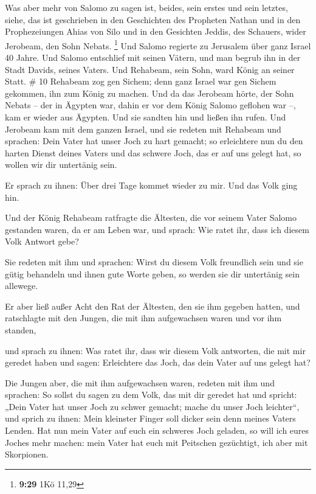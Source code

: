  Was aber mehr von Salomo zu sagen ist, beides, sein
erstes und sein letztes, siehe, das ist geschrieben in den Geschichten
des Propheten Nathan und in den Prophezeiungen Ahias von Silo und in den
Gesichten Jeddis, des Schauers, wider Jerobeam, den Sohn Nebats.
\footnote{\textbf{9:29} 1Kö 11,29}  Und Salomo regierte
zu Jerusalem über ganz Israel 40 Jahre.  Und Salomo
entschlief mit seinen Vätern, und man begrub ihn in der Stadt Davids,
seines Vaters. Und Rehabeam, sein Sohn, ward König an seiner Statt. \#
10  Rehabeam zog gen Sichem; denn ganz Israel war gen
Sichem gekommen, ihn zum König zu machen.  Und da das
Jerobeam hörte, der Sohn Nebats -- der in Ägypten war, dahin er vor dem
König Salomo geflohen war --, kam er wieder aus Ägypten. 
Und sie sandten hin und ließen ihn rufen. Und Jerobeam kam mit dem
ganzen Israel, und sie redeten mit Rehabeam und sprachen: 
Dein Vater hat unser Joch zu hart gemacht; so erleichtere nun du den
harten Dienst deines Vaters und das schwere Joch, das er auf uns gelegt
hat, so wollen wir dir untertänig sein.

 Er sprach zu ihnen: Über drei Tage kommet wieder zu mir.
Und das Volk ging hin.

 Und der König Rehabeam ratfragte die Ältesten, die vor
seinem Vater Salomo gestanden waren, da er am Leben war, und sprach: Wie
ratet ihr, dass ich diesem Volk Antwort gebe?

 Sie redeten mit ihm und sprachen: Wirst du diesem Volk
freundlich sein und sie gütig behandeln und ihnen gute Worte geben, so
werden sie dir untertänig sein allewege.

 Er aber ließ außer Acht den Rat der Ältesten, den sie ihm
gegeben hatten, und ratschlagte mit den Jungen, die mit ihm aufgewachsen
waren und vor ihm standen,

 und sprach zu ihnen: Was ratet ihr, dass wir diesem Volk
antworten, die mit mir geredet haben und sagen: Erleichtere das Joch,
das dein Vater auf uns gelegt hat?

 Die Jungen aber, die mit ihm aufgewachsen waren, redeten
mit ihm und sprachen: So sollst du sagen zu dem Volk, das mit dir
geredet hat und spricht: „Dein Vater hat unser Joch zu schwer gemacht;
mache du unser Joch leichter``, und sprich zu ihnen: Mein kleinster
Finger soll dicker sein denn meines Vaters Lenden.  Hat
nun mein Vater auf euch ein schweres Joch geladen, so will ich eures
Joches mehr machen: mein Vater hat euch mit Peitschen gezüchtigt, ich
aber mit Skorpionen.

